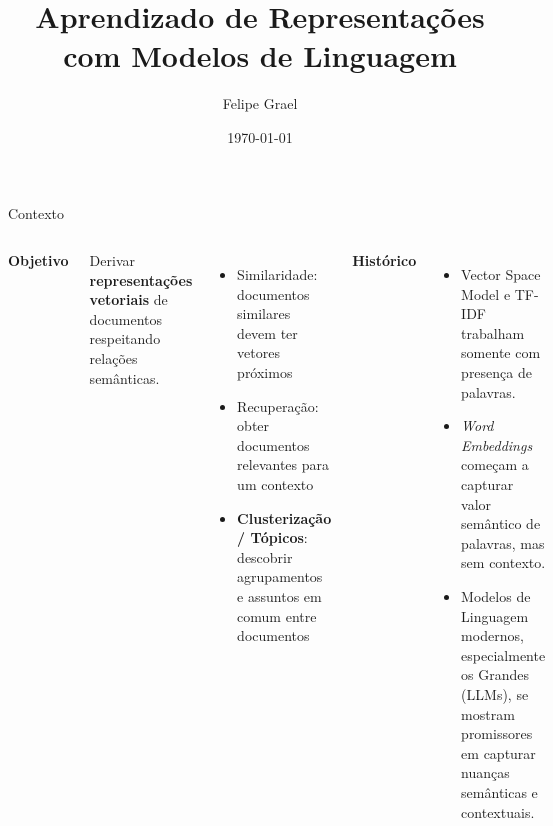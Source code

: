 \documentclass{beamer}
\title{Aprendizado de Representações com Modelos de Linguagem}
\author{Felipe Grael}
\date{\today}
\begin{document}
\maketitle

\begin{frame}{Contexto}

	\begin{columns}[t]

		\vspace{-5mm}

    \begin{center}
    \textbf{Objetivo}
    \end{center}

    Derivar \textbf{representações vetoriais} de documentos respeitando relações semânticas.

    \small
    \begin{itemize}
      \item Similaridade: documentos similares devem ter vetores próximos
      \item Recuperação: obter documentos relevantes para um contexto
      \item \textbf{Clusterização / Tópicos}: descobrir agrupamentos e assuntos em comum entre documentos
    \end{itemize}

		\vspace{-5mm}

    \begin{center}
    \textbf{Histórico}
    \end{center}
    \small
    \begin{itemize}
      \item Vector Space Model e TF-IDF trabalham somente com presença de palavras.
      \item \emph{Word Embeddings} começam a capturar valor semântico de palavras, mas sem contexto.
      \item Modelos de Linguagem modernos, especialmente os Grandes (LLMs), se mostram promissores em capturar nuanças semânticas e contextuais.
    \end{itemize}

  \end{columns}

\end{frame}
\end{document}
